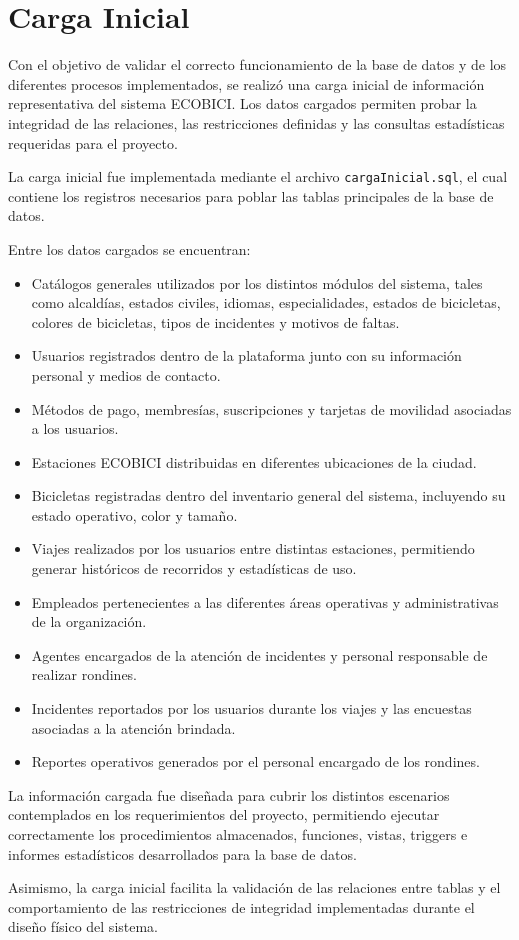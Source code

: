 \section{Carga Inicial}

Con el objetivo de validar el correcto funcionamiento de la base de datos y de los diferentes procesos implementados, se realizó una carga inicial de información representativa del sistema ECOBICI. Los datos cargados permiten probar la integridad de las relaciones, las restricciones definidas y las consultas estadísticas requeridas para el proyecto.

La carga inicial fue implementada mediante el archivo \texttt{cargaInicial.sql}, el cual contiene los registros necesarios para poblar las tablas principales de la base de datos.

Entre los datos cargados se encuentran:
\begin{itemize}
	\item Catálogos generales utilizados por los distintos módulos del sistema, tales como alcaldías, estados civiles, idiomas, especialidades, estados de bicicletas, colores de bicicletas, tipos de incidentes y motivos de faltas.
	\item Usuarios registrados dentro de la plataforma junto con su información personal y medios de contacto.
	\item Métodos de pago, membresías, suscripciones y tarjetas de movilidad asociadas a los usuarios.
	\item Estaciones ECOBICI distribuidas en diferentes ubicaciones de la ciudad.
	\item Bicicletas registradas dentro del inventario general del sistema, incluyendo su estado operativo, color y tamaño.
	\item Viajes realizados por los usuarios entre distintas estaciones, permitiendo generar históricos de recorridos y estadísticas de uso.
	\item Empleados pertenecientes a las diferentes áreas operativas y administrativas de la organización.
	\item Agentes encargados de la atención de incidentes y personal responsable de realizar rondines.
	\item Incidentes reportados por los usuarios durante los viajes y las encuestas asociadas a la atención brindada.
	\item Reportes operativos generados por el personal encargado de los rondines.
\end{itemize}

La información cargada fue diseñada para cubrir los distintos escenarios contemplados en los requerimientos del proyecto, permitiendo ejecutar correctamente los procedimientos almacenados, funciones, vistas, triggers e informes estadísticos desarrollados para la base de datos.

Asimismo, la carga inicial facilita la validación de las relaciones entre tablas y el comportamiento de las restricciones de integridad implementadas durante el diseño físico del sistema.
